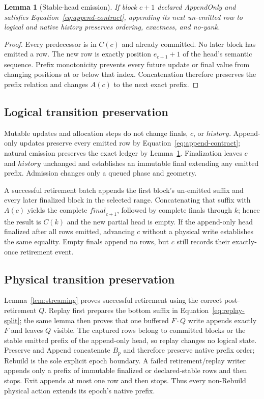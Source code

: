\documentclass[11pt]{article}
\newtheorem{lemma}[theorem]{Lemma}
\theoremstyle{definition}
\newcommand{\cat}{\mathbin{\cdot}}
\newcommand{\History}{\mathit{history}}
\newcommand{\Final}{\mathit{final}}
\begin{document}
\begin{lemma}[Stable-head emission]
\label{lem:append}
If block $c+1$ declared AppendOnly and satisfies
Equation~\eqref{eq:append-contract}, appending its next un-emitted row to
logical and native history preserves ordering, exactness, and no-yank.
\end{lemma}

\begin{proof}
Every predecessor is in $C(c)$ and already committed.  No later block has
emitted a row.  The new row is exactly position $e_{c+1}+1$ of the head's
semantic sequence.  Prefix monotonicity prevents every future update or final
value from changing positions at or below that index.  Concatenation therefore
preserves the prefix relation and changes $A(c)$ to the next exact prefix.
\end{proof}

\subsection{Logical transition preservation}

Mutable updates and allocation steps do not change finals, $c$, or
$\History$.  Append-only updates preserve every emitted row by
Equation~\eqref{eq:append-contract}; natural emission preserves the exact
ledger by Lemma~\ref{lem:append}.  Finalization leaves $c$ and $\History$
unchanged and establishes an immutable final extending any emitted prefix.
Admission changes only a queued phase and geometry.

A successful retirement batch appends the first block's un-emitted suffix and
every later finalized block in the selected range.  Concatenating that suffix
with $A(c)$ yields the complete $\Final_{c+1}$, followed by complete finals
through $k$; hence the result is $C(k)$ and the new partial head is empty.  If
the append-only head finalized after all rows emitted, advancing $c$ without a
physical write establishes the same equality.  Empty finals append no rows,
but $c$ still records their exactly-once retirement event.

\subsection{Physical transition preservation}

Lemma~\ref{lem:streaming} proves successful retirement using the correct
post-retirement $Q$.  Replay first prepares the bottom suffix in
Equation~\eqref{eq:replay-split}; the same lemma then proves that one buffered
$F\cat Q$ write appends exactly $F$ and leaves $Q$ visible.  The captured rows
belong to committed blocks or the stable emitted prefix of the append-only
head, so replay changes no logical state.  Preserve and Append concatenate
$B_p$ and therefore preserve native prefix order; Rebuild is the sole explicit
epoch boundary.  A failed retirement/replay writer appends only a prefix of
immutable finalized or declared-stable rows and then stops.  Exit appends at most one row and then stops.  Thus every
non-Rebuild physical action extends its epoch's native prefix.
\end{document}
